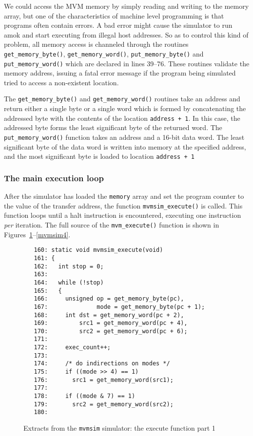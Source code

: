 We could access the MVM memory by simply reading and writing to the
memory array, but one of the characteristics of machine level
programming is that programs often contain errors. A bad error might
cause the simulator to run amok and start executing from illegal host
addresses. So as to control this kind of problem, all memory access is
channeled through the routines \verb+get_memory_byte()+,
\verb+get_memory_word()+, \verb+put_memory_byte()+ and
\verb+put_memory_word()+ which are declared in lines 39--76. These
routines validate the memory address, issuing a fatal error message if
the program being simulated tried to access a non-existent location.

The \verb+get_memory_byte()+ and \verb+get_memory_word()+ routines take
an address and return either a single byte or a single word which is
formed by concatenating the addressed byte with the contents of the
location \verb!address + 1!. In this case, the addressed byte forms the
least significant byte of the returned word. The
\verb+put_memory_word()+ function takes an address and a 16-bit data
word. The least significant byte of the data word is written into memory
at the specified address,  and the most significant byte is loaded to
location \verb!address + 1!

\subsubsection{The main execution loop}

After the simulator has loaded the {\tt memory} array and set the
program counter to the value of the transfer address, the function
\verb+mvmsim_execute()+ is called. This function loops until a {\sc
halt} instruction is encountered, executing one instruction {\em per}
iteration. The full source of the \verb+mvm_execute()+ function is shown in
Figures~\ref{mvmsim2}--\ref{mvmsim4}.

\begin{figure}
\hspace*{0cm}
\begin{minipage}{30cm}
\footnotesize
\begin{verbatim}
   160: static void mvmsim_execute(void)
   161: {
   162:   int stop = 0;
   163: 
   164:   while (!stop)
   165:   {
   166:     unsigned op = get_memory_byte(pc),
   167:              mode = get_memory_byte(pc + 1);
   168:     int dst = get_memory_word(pc + 2),
   169:         src1 = get_memory_word(pc + 4),
   170:         src2 = get_memory_word(pc + 6);
   171: 
   172:     exec_count++;
   173:     
   174:     /* do indirections on modes */
   175:     if ((mode >> 4) == 1)
   176:       src1 = get_memory_word(src1);
   177: 
   178:     if ((mode & 7) == 1)
   179:       src2 = get_memory_word(src2);
   180: 
\end{verbatim}
\end{minipage}
\caption{Extracts from the {\tt mvmsim} simulator: the execute function part 1}
\label{mvmsim2}
\end{figure}

